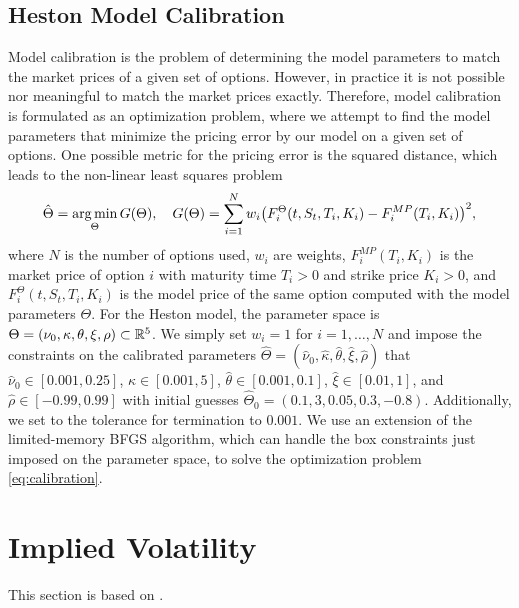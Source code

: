 \subsection{Heston Model Calibration}
Model calibration is the problem of determining the model parameters to match the market prices of a given set of options. However, in practice it is not possible nor meaningful to match the market prices exactly. Therefore, model calibration is formulated as an optimization problem, where we attempt to find the model parameters that minimize the pricing error by our model on a given set of options. One possible metric for the pricing error is the squared distance, which leads to the non-linear least squares problem
\begin{equation}\label{eq:calibration}
    \hat{\Theta}=\argmin_{\Theta}G(\Theta),\quad G(\Theta)= \sum_{i=1}^{N}w_{i}\left(F^{\Theta}_{i}(t,S_{t},T_{i},K_{i}) - F_{i}^{MP}(T_{i},K_{i})\right)^{2},
\end{equation}
where $N$ is the number of options used, $w_{i}$ are weights, $F^{MP}_{i}(T_{i},K_{i})$ is the market price of option $i$ with maturity time $T_{i}>0$ and strike price $K_{i}>0$, and $F^{\Theta}_{i}(t,S_{t},T_{i},K_{i})$ is the model price of the same option computed with the model parameters $\Theta$. For the Heston model, the parameter space is $\Theta=(\nu_{0},\kappa,\theta,\xi,\rho)\subset \mathbb{R}^{5}$. We simply set $w_{i}=1$ for $i=1,\dots,N$ and impose the constraints on the calibrated parameters $\hat{\Theta}=(\hat{\nu}_{0},\hat{\kappa},\hat{\theta},\hat{\xi},\hat{\rho})$ that $\hat{\nu}_{0}\in [0.001, 0.25]$, $\hat{\kappa}\in [0.001, 5]$, $\hat{\theta}\in [0.001, 0.1]$, $\hat{\xi}\in [0.01, 1]$, and $\hat{\rho}\in [-0.99, 0.99]$ with initial guesses $\hat{\Theta}_{0}=(0.1, 3, 0.05, 0.3, -0.8)$. Additionally, we set to the tolerance for termination to $0.001$. We use an extension of the limited-memory BFGS algorithm, which can handle the box constraints just imposed on the parameter space, to solve the optimization problem \eqref{eq:calibration}.
\section{Implied Volatility}
This section is based on \cite{impvol}.


